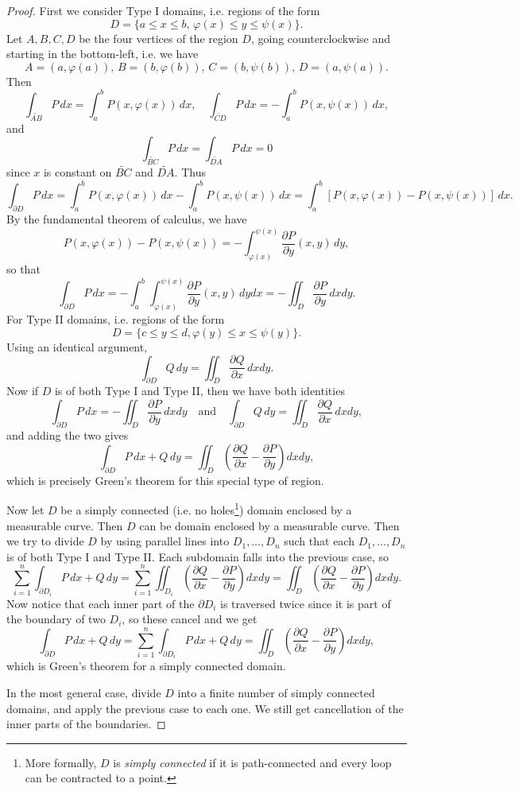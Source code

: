\begin{proof}
  First we consider Type I domains, i.e. regions of
  the form
  \[
    D = \{a \le x \le b,\, \varphi(x) \le y \le \psi(x)\}.
  \]
  Let $A, B, C, D$ be the four vertices of the
  region $D$, going counterclockwise and starting
  in the bottom-left, i.e. we have
  \[
    A = (a, \varphi(a)),\, B = (b, \varphi(b)),\, C = (b, \psi(b)),\, D = (a, \psi(a)).
  \]
  Then
  \[
    \int_{\widetilde{AB}} P\, dx = \int_a^b P(x, \varphi(x))\, dx,
    \quad
    \int_{\widetilde{CD}} P\, dx = -\int_a^b P(x, \psi(x))\, dx,
  \]
  and
  \[
    \int_{\widetilde{BC}} P\, dx = \int_{\widetilde{DA}} P\, dx = 0
  \]
  since $x$ is constant on $\widetilde{BC}$ and $\widetilde{DA}$. Thus
  \[
    \int_{\partial D} P\, dx = \int_a^b P(x, \varphi(x))\, dx - \int_a^b P(x, \psi(x))\, dx
    = \int_a^b [P(x, \varphi(x)) - P(x, \psi(x))]\, dx.
  \]
  By the fundamental theorem of calculus, we have
  \[
    P(x, \varphi(x)) - P(x, \psi(x)) = -\int_{\varphi(x)}^{\psi(x)} \frac{\partial P}{\partial y}(x, y)\, dy,
  \]
  so that
  \[
    \int_{\partial D} P\, dx = -\int_a^b \int_{\varphi(x)}^{\psi(x)} \frac{\partial P}{\partial y}(x, y)\, dy dx
    = -\iint_D \frac{\partial P}{\partial y}\, dx dy.
  \]
  For Type II domains, i.e. regions of the form
  \[
    D = \{c \le y \le d, \varphi(y) \le x \le \psi(y)\}.
  \]
  Using an identical argument,
  \[
    \int_{\partial D} Q\, dy = \iint_D \frac{\partial Q}{\partial x}\, dx dy.
  \]
  Now if $D$ is of both Type I and Type II, then we
  have both identities
  \[
    \int_{\partial D} P\, dx = -\iint_D \frac{\partial P}{\partial y}\, dx dy
    \quad \text{and} \quad
    \int_{\partial D} Q\, dy = \iint_D \frac{\partial Q}{\partial x}\, dx dy,
  \]
  and adding the two gives
  \[
    \int_{\partial D} P\, dx + Q\, dy = \iint_D \left(\frac{\partial Q}{\partial x} - \frac{\partial P}{\partial y}\right) dx dy,
  \]
  which is precisely Green's theorem for this special
  type of region.
  
  Now let $D$ be a simply connected (i.e. no holes\footnote{More formally, $D$ is \emph{simply connected} if it is path-connected and every loop can be contracted to a point.}) domain enclosed by a measurable curve. Then $D$ can be
  domain enclosed by a measurable curve. Then we try
  to divide $D$ by using parallel lines into
  $D_1, \dots, D_n$ such that each $D_1, \dots, D_n$
  is of both Type I and Type II. Each subdomain falls
  into the previous case, so
  \[
    \sum_{i = 1}^n \int_{\partial D_i} P\, dx + Q\, dy = \sum_{i = 1}^n \iint_{D_i} \left(\frac{\partial Q}{\partial x} - \frac{\partial P}{\partial y}\right) dx dy
    = \iint_D \left(\frac{\partial Q}{\partial x} - \frac{\partial P}{\partial y}\right) dx dy.
  \]
  Now notice that each inner part of the $\partial D_i$
  is traversed twice since it is part of the boundary
  of two $D_i$, so these cancel and we get
  \[
    \int_{\partial D} P\, dx + Q\, dy
    = \sum_{i = 1}^n \int_{\partial D_i} P\, dx + Q\, dy
    = \iint_D \left(\frac{\partial Q}{\partial x} - \frac{\partial P}{\partial y}\right) dx dy,
  \]
  which is Green's theorem for a simply connected
  domain.

  In the most general case, divide $D$ into a finite
  number of simply connected domains, and
  apply the previous case to each one. We still get
  cancellation of the inner parts of the boundaries.
\end{proof}
